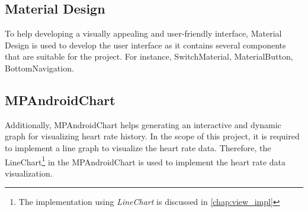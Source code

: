 \subsection{Material Design}
To help developing a visually appealing and user-friendly interface, Material Design is used to develop the user interface as it contains several components that are suitable for the project. 
For instance, SwitchMaterial, MaterialButton, BottomNavigation.

\subsection{MPAndroidChart}
Additionally, MPAndroidChart helps generating an interactive and dynamic graph for visualizing heart rate history.
In the scope of this project, it is required to implement a line graph to visualize the heart rate data. 
Therefore, the LineChart\footnote{The implementation using \emph{LineChart} is discussed in \autoref{chap:view_impl}} in the MPAndroidChart is used to implement the heart rate data visualization.

